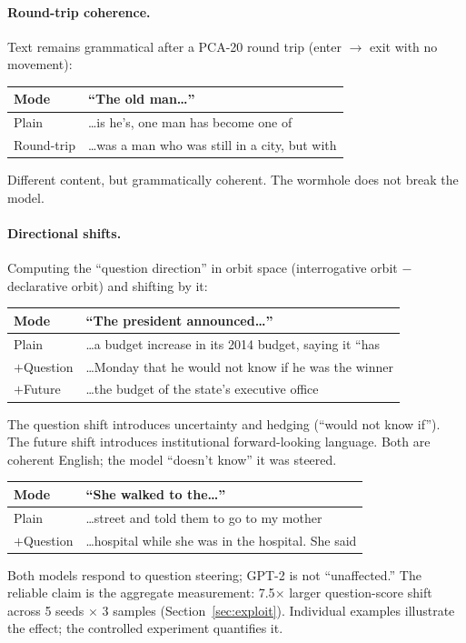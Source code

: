 \documentclass[11pt, a4paper]{article}
\theoremstyle{plain}
\theoremstyle{definition}
\theoremstyle{remark}
\begin{document}
\paragraph{Round-trip coherence.}
Text remains grammatical after a PCA-20 round trip (enter $\to$ exit with no movement):
\begin{center}\small
\begin{tabular}{lp{9cm}}
\toprule
\textbf{Mode} & \textbf{``The old man\ldots''} \\
\midrule
Plain & \ldots is he's, one man has become one of \\
Round-trip & \ldots was a man who was still in a city, but with \\
\bottomrule
\end{tabular}
\end{center}
Different content, but grammatically coherent.
The wormhole does not break the model.

\paragraph{Directional shifts.}
Computing the ``question direction'' in orbit space (interrogative orbit $-$ declarative orbit) and shifting by it:
\begin{center}\small
\begin{tabular}{lp{9cm}}
\toprule
\textbf{Mode} & \textbf{``The president announced\ldots''} \\
\midrule
Plain & \ldots a budget increase in its 2014 budget, saying it ``has \\
$+$Question & \ldots Monday that he would not know if he was the winner \\
$+$Future & \ldots the budget of the state's executive office \\
\bottomrule
\end{tabular}
\end{center}
The question shift introduces uncertainty and hedging (``would not know if'').
The future shift introduces institutional forward-looking language.
Both are coherent English; the model ``doesn't know'' it was steered.

\begin{center}\small
\begin{tabular}{lp{9cm}}
\toprule
\textbf{Mode} & \textbf{``She walked to the\ldots''} \\
\midrule
Plain & \ldots street and told them to go to my mother \\
$+$Question & \ldots hospital while she was in the hospital. She said \\
\bottomrule
\end{tabular}
\end{center}
Both models respond to question steering; GPT-2 is not ``unaffected.''
The reliable claim is the aggregate measurement: 7.5$\times$ larger question-score shift across 5 seeds $\times$ 3 samples (Section~\ref{sec:exploit}).
Individual examples illustrate the effect; the controlled experiment quantifies it.
\end{document}
